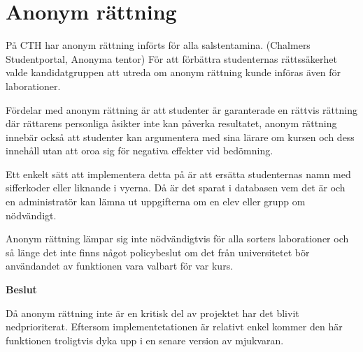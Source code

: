 \section{Anonym rättning}

På CTH har anonym rättning införts för alla salstentamina. (Chalmers Studentportal, Anonyma tentor) För att förbättra studenternas rättssäkerhet valde kandidatgruppen att utreda om anonym rättning kunde införas även för laborationer.

Fördelar med anonym rättning är att studenter är garanterade en rättvis rättning där rättarens personliga åsikter inte kan påverka resultatet, anonym rättning innebär också att studenter kan argumentera med sina lärare om kursen och dess innehåll utan att oroa sig för negativa effekter vid bedömning.

Ett enkelt sätt att implementera detta på är att ersätta studenternas namn med sifferkoder eller liknande i vyerna. Då är det sparat i databasen vem det är och en administratör kan lämna ut uppgifterna om en elev eller grupp om nödvändigt.

Anonym rättning lämpar sig inte nödvändigtvis för alla sorters laborationer och så länge det inte finns något policybeslut om det från universitetet bör användandet av funktionen vara valbart för var kurs.

\begin{flushright}

  \textbf{Beslut}

  Då anonym rättning inte är en kritisk del av projektet har det blivit nedprioriterat.
Eftersom implementetationen är relativt enkel kommer den här funktionen troligtvis dyka upp i en senare version av mjukvaran.
\end{flushright}
